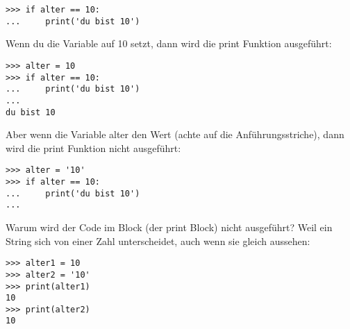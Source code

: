 \begin{Verbatim}[frame=single]
>>> if alter == 10:
...     print('du bist 10')
\end{Verbatim}

Wenn du die Variable auf 10 setzt, dann wird die print Funktion ausgeführt:

\begin{Verbatim}[frame=single]
>>> alter = 10
>>> if alter == 10:
...     print('du bist 10')
...
du bist 10
\end{Verbatim}

Aber wenn die Variable alter den Wert  (achte auf die Anführungsstriche), dann wird die print Funktion nicht ausgeführt:

\begin{Verbatim}[frame=single]
>>> alter = '10'
>>> if alter == 10:
...     print('du bist 10')
...
\end{Verbatim}

Warum wird der Code im Block (der print Block) nicht ausgeführt? Weil ein String sich von einer Zahl unterscheidet, auch wenn sie gleich aussehen:

\begin{Verbatim}[frame=single]
>>> alter1 = 10
>>> alter2 = '10'
>>> print(alter1)
10
>>> print(alter2)
10
\end{Verbatim}


